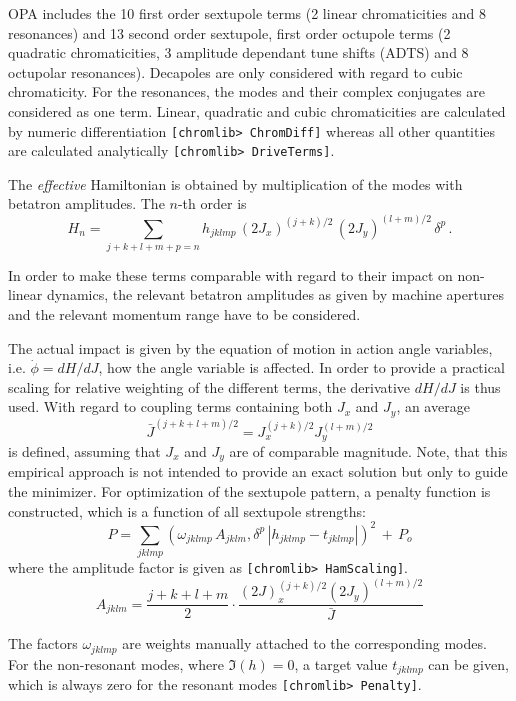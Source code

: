 \documentclass[12pt]{article}
\newcommand\beq{\begin{equation}}
\newcommand\eeq{\end{equation}}
\newcommand\code[1]{{\tt [#1]}}
\begin{document}
OPA includes the 10 first order sextupole terms (2 linear  chromaticities
and 8 resonances) and 13 second order sextupole, first order octupole terms (2 quadratic chromaticities, 3 amplitude dependant tune shifts (ADTS) and 8 octupolar resonances). Decapoles are only considered with regard to cubic chromaticity. For the resonances, the modes and their complex conjugates are considered as one term.
Linear, quadratic and cubic chromaticities are calculated by numeric differentiation \code{chromlib> ChromDiff} whereas all other quantities are calculated analytically \code{chromlib> DriveTerms}.

The {\em effective} Hamiltonian is obtained by multiplication of the modes with betatron amplitudes. The $n$-th order is
\[
H_n = \sum_{j+k+l+m+p=n} h_{jklmp}\, (2J_x)^{(j+k)/2} \,(2J_y)^{(l+m)/2}\, \delta^p\, .
\]

In order to make these terms comparable with regard to their impact on non-linear dynamics, the relevant betatron amplitudes as given by machine apertures and the relevant momentum range have to be considered.

The actual impact is given by the equation of motion in action angle variables, i.e. 
$\dot\phi=dH/dJ$, how the angle variable is affected. In order to provide a practical scaling for relative weighting of the different terms, the derivative $dH/dJ$ is thus used. 
With regard to coupling terms containing both $J_x$ and $J_y$, an average 
\[
\bar J^{(j+k+l+m)/2} = J_x^{(j+k)/2} J_y^{(l+m)/2}
\]
is defined, assuming that $J_x$ and $J_y$ are of comparable magnitude.
Note, that this empirical approach is not intended to provide an exact solution but only to guide the minimizer.
For optimization of the sextupole pattern, a penalty function is constructed, which is a function of all sextupole strengths:
\beq\label{eqpenal}
P = \sum_{jklmp} \left( \omega_{jklmp} \, A_{jklm}, \delta^p \, |h_{jklmp}   -t_{jklmp}| \right)^2\, + \, P_o
\eeq
where the amplitude factor is given as \code{chromlib> HamScaling}.
\[
A_{jklm}= \frac{j+k+l+m}{2}\cdot \frac{ (2J)_x^{(j+k)/2} (2J_y)^{(l+m)/2}}{\bar J}
\]

The factors $\omega_{jklmp}$ are weights manually attached to the corresponding modes.
For the non-resonant modes, where $\Im (h)=0$, a target value
$t_{jklmp}$ can be given, which is always zero for the resonant modes \code{chromlib> Penalty}.
\end{document}
